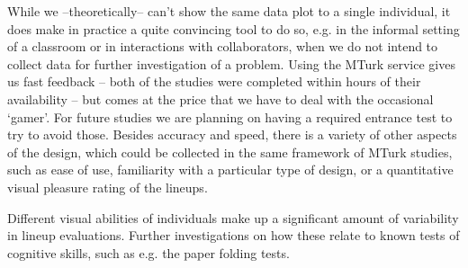 While we --theoretically-- can't show the same data plot to a single individual, it does make in practice a quite convincing tool to do so, e.g. in the informal setting of a classroom or in interactions with collaborators, when we do not intend to collect data for further investigation of a problem. 
Using the MTurk service gives us fast feedback -- both of the studies were completed within hours of their availability -- but comes at the price that we have to deal with the occasional `gamer'. For future studies we are planning on having a required entrance  test to try to avoid those. Besides accuracy and speed, there is a variety of other aspects of the design, which could be collected in  the same framework of  MTurk studies, such as ease of use, familiarity with a particular type of design, or a quantitative visual pleasure rating of the lineups.

Different visual abilities of individuals make up a significant amount of variability in lineup evaluations. Further investigations on how these relate to known  tests of cognitive skills, such as e.g. the paper folding tests.
